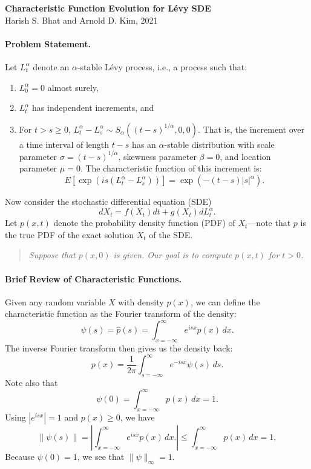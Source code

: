 \documentclass[11pt,letterpaper]{article}
\begin{document}
\begin{center}
\textbf{Characteristic Function Evolution for L\'{e}vy SDE}\\
Harish S. Bhat and Arnold D. Kim, 2021
\end{center}

\paragraph{Problem Statement.} Let $L_t^{\alpha}$ denote an $\alpha$-stable L\'{e}vy process, i.e., a process such that:
\begin{enumerate}
\item $L_0^\alpha = 0$ almost surely,
\item $L_t^\alpha$ has independent increments, and
\item For $t > s \geq 0$, $L_t^\alpha - L_s^\alpha \sim S_\alpha((t-s)^{1/\alpha},0,0)$.  That is, the increment over a time interval of length $t-s$ has an $\alpha$-stable distribution with scale parameter $\sigma = (t-s)^{1/\alpha}$, skewness parameter $\beta=0$, and location parameter $\mu=0$.  The characteristic function of this increment is:
\begin{equation}
\label{eqn:cfinc}
E[\exp(i s (L_t^\alpha - L_s^\alpha))] = \exp(-(t-s) |s|^\alpha).
\end{equation}
\end{enumerate}

\noindent Now consider the stochastic differential equation (SDE)
\begin{equation}
\label{eqn:sde}
dX_t = f(X_t) dt + g(X_t) dL_t^{\alpha}.
\end{equation}
Let $p(x,t)$ denote the probability density function (PDF) of $X_t$---note that $p$ is the true PDF of the exact solution $X_t$ of the SDE.

\begin{quote}
\emph{Suppose that $p(x,0)$ is given.  Our goal is to compute $p(x,t)$ for $t > 0$.}
\end{quote}

\paragraph{Brief Review of Characteristic Functions.} Given any random variable $X$ with density $p(x)$, we can define the characteristic function as the Fourier transform of the density:
\begin{equation}
\label{eqn:forft}
\psi(s) = \widehat{p}(s) = \int_{x=-\infty}^\infty e^{i s x} p(x) \, dx.
\end{equation}
The inverse Fourier transform then gives us the density back:
\begin{equation}
\label{eqn:invft}
p(x) = \frac{1}{2 \pi} \int_{s=-\infty}^{\infty} e^{-i s x} \psi(s) \, ds.
\end{equation}
Note also that
\[
\psi(0) = \int_{x=-\infty}^\infty p(x) \, dx = 1.
\]
Using $|e^{i s x}| = 1$ and $p(x) \geq 0$, we have
\[
\| \psi(s) \| = \left| \int_{x=-\infty}^\infty e^{i s x} p(x) \, dx. \right| \leq \int_{x=-\infty}^\infty p(x) \, dx = 1,
\]
Because $\psi(0) = 1$, we see that $\|\psi \|_\infty = 1$.
\end{document}
